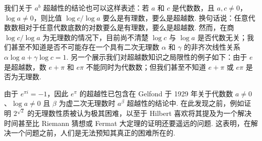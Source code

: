 我们关于 $a^b$ 超越性的结论也可以这样表述：若 $a$ 和 $c$ 是代数数，且 $a, c \neq 0$，$\log a \neq 0$，则比值 $\log c / \log a$ 要么是有理数，要么是超越数. 换句话说：任意代数数相对于任意代数底数的对数要么是有理数，要么是超越数. 然而，在商 $\log c / \log a$ 为无理数的情况下，目前尚不清楚 $\log c$ 与 $\log a$ 是否代数无关；我们甚至不知道是否不可能存在一个具有二次无理数 $\alpha$ 和 $\gamma$ 的非齐次线性关系 $\alpha \log a + \gamma \log c = 1$. 另一个展示我们对超越数知识之局限性的例子如下：由于 $e$ 是超越数，数 $e + \pi$ 和 $e \pi$ 不能同时为代数数；但我们甚至不知道 $e + \pi$ 或 $e \pi$ 是否为无理数.

由于 $e^{\pi i} = -1$，因此 $e^\pi$ 的超越性已包含在 Gelfond 于 1929 年关于代数数 $a \neq 0$、$\log a \neq 0$ 且 $\beta$ 为虚二次无理数时 $a^\beta$ 超越性的结论中. 在此发现之前，例如证明 $2^{\sqrt{2}}$ 的无理数性质被认为极其困难，以至于 Hilbert 喜欢将其提及为一个解决时间甚至比 Riemann 猜想或 Fermat 大定理的证明还要遥远的问题. 这表明，在解决一个问题之前，人们是无法预知其真正的困难所在的.
